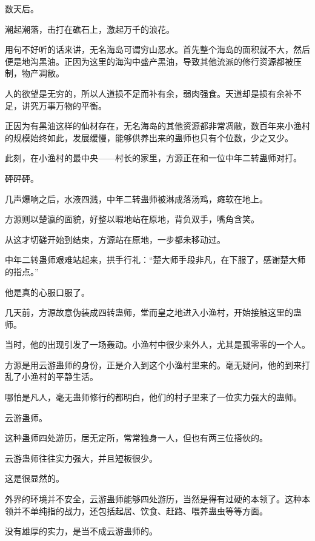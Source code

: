 
\begin{this_body}



数天后。

潮起潮落，击打在礁石上，激起万千的浪花。

用句不好听的话来讲，无名海岛可谓穷山恶水。首先整个海岛的面积就不大，然后便是地沟黑油。正因为这里的海沟中盛产黑油，导致其他流派的修行资源都被压制，物产凋敝。

人的欲望是无穷的，所以人道损不足而补有余，弱肉强食。天道却是损有余补不足，讲究万事万物的平衡。

正因为有黑油这样的仙材存在，无名海岛的其他资源都非常凋敝，数百年来小渔村的规模始终如此，发展缓慢，能够供养出来的蛊师也只有个位数，少之又少。

此刻，在小渔村的最中央——村长的家里，方源正在和一位中年二转蛊师对打。

砰砰砰。

几声爆响之后，水液四溅，中年二转蛊师被淋成落汤鸡，瘫软在地上。

方源则以楚瀛的面貌，好整以暇地站在原地，背负双手，嘴角含笑。

从这才切磋开始到结束，方源站在原地，一步都未移动过。

中年二转蛊师艰难站起来，拱手行礼：“楚大师手段非凡，在下服了，感谢楚大师的指点。”

他是真的心服口服了。

几天前，方源故意伪装成四转蛊师，堂而皇之地进入小渔村，开始接触这里的蛊师。

当时，他的出现引发了一场轰动。小渔村中很少来外人，尤其是孤零零的一个人。

方源是用云游蛊师的身份，正是介入到这个小渔村里来的。毫无疑问，他的到来打乱了小渔村的平静生活。

哪怕是凡人，毫无蛊师修行的都明白，他们的村子里来了一位实力强大的蛊师。

云游蛊师。

这种蛊师四处游历，居无定所，常常独身一人，但也有两三位搭伙的。

云游蛊师往往实力强大，并且短板很少。

这是很显然的。

外界的环境并不安全，云游蛊师能够四处游历，当然是得有过硬的本领了。这种本领并不单纯指的战力，还包括起居、饮食、赶路、喂养蛊虫等等方面。

没有雄厚的实力，是当不成云游蛊师的。


\end{this_body}
